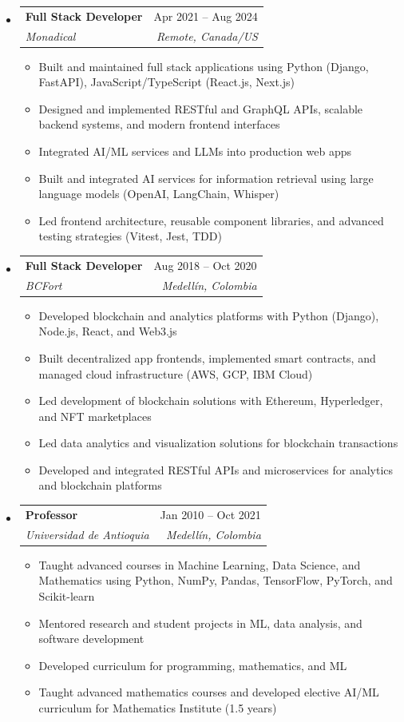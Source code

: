 \documentclass[letterpaper,11pt]{article}
\makeatletter
\newcommand{\resumeSubheading}[4]{
  \vspace{-2pt}
  \item[]
  \begin{tabular*}{\textwidth}{@{\extracolsep{\fill}}l r}
    \textbf{#1} & #2 \\
    \textit{#3} & \textit{#4} \\
  \end{tabular*}
  \vspace{-5pt}
}
\makeatother
\begin{document}
\begin{itemize}[leftmargin=0pt, itemindent=0pt, label={}, itemsep=1pt]
\resumeSubheading
{Full Stack Developer}{Apr 2021 -- Aug 2024}
{Monadical}{Remote, Canada/US}
\begin{itemize}[leftmargin=*, itemsep=0pt]
    \item Built and maintained full stack applications using Python (Django, FastAPI), JavaScript/TypeScript (React.js, Next.js)
    \item Designed and implemented RESTful and GraphQL APIs, scalable backend systems, and modern frontend interfaces
    \item Integrated AI/ML services and LLMs into production web apps
    \item Built and integrated AI services for information retrieval using large language models (OpenAI, LangChain, Whisper)
    \item Led frontend architecture, reusable component libraries, and advanced testing strategies (Vitest, Jest, TDD)
\end{itemize}

\resumeSubheading
{Full Stack Developer}{Aug 2018 -- Oct 2020}
{BCFort}{Medellín, Colombia}
\begin{itemize}[leftmargin=*, itemsep=0pt]
    \item Developed blockchain and analytics platforms with Python (Django), Node.js, React, and Web3.js
    \item Built decentralized app frontends, implemented smart contracts, and managed cloud infrastructure (AWS, GCP, IBM Cloud)
    \item Led development of blockchain solutions with Ethereum, Hyperledger, and NFT marketplaces
    \item Led data analytics and visualization solutions for blockchain transactions
    \item Developed and integrated RESTful APIs and microservices for analytics and blockchain platforms
\end{itemize}

\resumeSubheading
{Professor}{Jan 2010 -- Oct 2021}
{Universidad de Antioquia}{Medellín, Colombia}
\begin{itemize}[leftmargin=*, itemsep=0pt]
    \item Taught advanced courses in Machine Learning, Data Science, and Mathematics using Python, NumPy, Pandas, TensorFlow, PyTorch, and Scikit-learn
    \item Mentored research and student projects in ML, data analysis, and software development
    \item Developed curriculum for programming, mathematics, and ML
    \item Taught advanced mathematics courses and developed elective AI/ML curriculum for Mathematics Institute (1.5 years)
\end{itemize}

\end{itemize}
\end{document}
